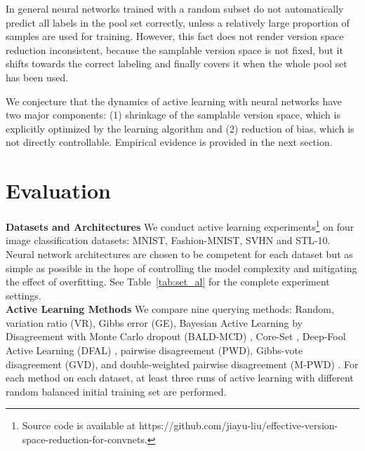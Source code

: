 \documentclass[runningheads, envcountsame, a4paper]{llncs}
\begin{document}
In general neural networks trained with a random subset do not automatically predict all labels in the pool set correctly, unless a relatively large proportion of samples are used for training. However, this fact does not render version space reduction inconsistent, because the samplable version space is not fixed, but it shifts towards the correct labeling and finally covers it when the whole pool set has been used.

We conjecture that the dynamics of active learning with neural networks have two major components: (1) shrinkage of the samplable version space, which is explicitly optimized by the learning algorithm and (2) reduction of bias, which is not directly controllable. Empirical evidence is provided in the next section.




\section{Evaluation}
\label{sec:evaluation}
\noindent\textbf{Datasets and Architectures} 
We conduct active learning experiments\footnote{Source code is available at https://github.com/jiayu-liu/effective-version-space-reduction-for-convnets.} on four image classification datasets: MNIST, Fashion-MNIST, SVHN and STL-10.
Neural network architectures are chosen to be competent for each dataset but as simple as possible in the hope of controlling the model complexity and mitigating the effect of overfitting.
See Table~\ref{tab:set_al} for the complete experiment settings. \\

\noindent\textbf{Active Learning Methods} 
We compare nine querying methods: Random, variation ratio (VR), Gibbs error (GE), Bayesian Active Learning by Disagreement with Monte Carlo dropout (BALD-MCD) \cite{Houlsby11,Gal17}, Core-Set \cite{Sener18}, Deep-Fool Active Learning (DFAL) \cite{Ducoffe18}, pairwise disagreement (PWD), Gibbs-vote disagreement (GVD), and double-weighted pairwise disagreement (M-PWD) \cite{Tosh17}. For each method on each dataset, at least three runs of active learning with different random balanced initial training set are performed. \\
\end{document}
